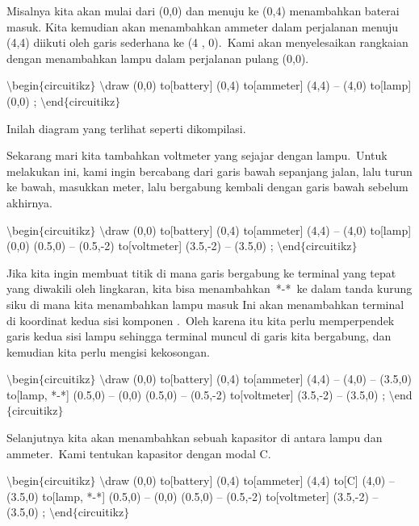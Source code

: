 \noindent 
Misalnya kita akan mulai dari (0,0) dan menuju ke (0,4) menambahkan baterai masuk. Kita kemudian akan menambahkan ammeter dalam perjalanan menuju (4,4) diikuti oleh garis sederhana ke (4 , 0). Kami akan menyelesaikan rangkaian dengan menambahkan lampu dalam perjalanan pulang (0,0).
\par


\noindent 
 $\setminus$begin$ \{ $circuitikz$ \} $ $\setminus$draw (0,0) to[battery] (0,4) to[ammeter] (4,4) -- (4,0) to[lamp] (0,0) ; $\setminus$end$ \{ $circuitikz$ \} $ 
\par


\noindent 
Inilah diagram yang terlihat seperti dikompilasi.
\par


\noindent 
Sekarang mari kita tambahkan voltmeter yang sejajar dengan lampu. Untuk melakukan ini, kami ingin bercabang dari garis bawah sepanjang jalan, lalu turun ke bawah, masukkan meter, lalu bergabung kembali dengan garis bawah sebelum akhirnya.
\par


\noindent 
 $\setminus$begin$ \{ $circuitikz$ \} $ $\setminus$draw (0,0) to[battery] (0,4) to[ammeter] (4,4) -- (4,0) to[lamp] (0,0) (0.5,0) -- (0.5,-2) to[voltmeter] (3.5,-2) -- (3.5,0) ; $\setminus$end$ \{ $circuitikz$ \} $ 
\par


\noindent 
Jika kita ingin membuat titik di mana garis bergabung ke terminal yang tepat yang diwakili oleh lingkaran, kita bisa menambahkan *-* ke dalam tanda kurung siku di mana kita menambahkan lampu masuk Ini akan menambahkan terminal di koordinat kedua sisi komponen . Oleh karena itu kita perlu memperpendek garis kedua sisi lampu sehingga terminal muncul di garis kita bergabung, dan kemudian kita perlu mengisi kekosongan.
\par


\noindent 
 $\setminus$begin$ \{ $circuitikz$ \} $ $\setminus$draw (0,0) to[battery] (0,4) to[ammeter] (4,4) -- (4,0) -- (3.5,0) to[lamp, *-*] (0.5,0) -- (0,0) (0.5,0) -- (0.5,-2) to[voltmeter] (3.5,-2) -- (3.5,0) ; $\setminus$end$ \{ $circuitikz$ \} $ 
\par


\noindent 
Selanjutnya kita akan menambahkan sebuah kapasitor di antara lampu dan ammeter. Kami tentukan kapasitor dengan modal C.
\par


\noindent 
 $\setminus$begin$ \{ $circuitikz$ \} $ $\setminus$draw (0,0) to[battery] (0,4) to[ammeter] (4,4) to[C] (4,0) -- (3.5,0) to[lamp, *-*] (0.5,0) -- (0,0) (0.5,0) -- (0.5,-2) to[voltmeter] (3.5,-2) -- (3.5,0) ; $\setminus$end$ \{ $circuitikz$ \} $ 
\par


